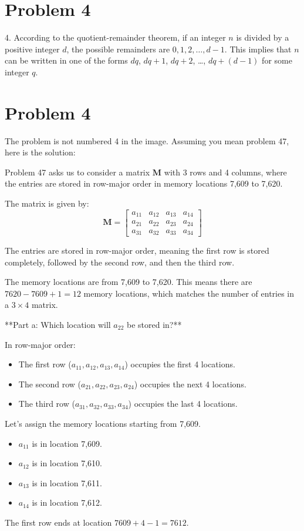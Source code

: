 \documentclass{article}
\begin{document}
\newpage

\section*{Problem 4}
4. According to the quotient-remainder theorem, if an integer $n$ is divided by a positive integer $d$, the possible remainders are $0, 1, 2, \dots, d-1$. This implies that $n$ can be written in one of the forms $dq$, $dq+1$, $dq+2$, \dots, $dq+(d-1)$ for some integer $q$.

\newpage

\section*{Problem 4}
The problem is not numbered 4 in the image. Assuming you mean problem 47, here is the solution:

Problem 47 asks us to consider a matrix $\mathbf{M}$ with 3 rows and 4 columns, where the entries are stored in row-major order in memory locations 7,609 to 7,620.

The matrix is given by:
$$
\mathbf{M} = \begin{bmatrix}
a_{11} & a_{12} & a_{13} & a_{14} \\
a_{21} & a_{22} & a_{23} & a_{24} \\
a_{31} & a_{32} & a_{33} & a_{34}
\end{bmatrix}
$$

The entries are stored in row-major order, meaning the first row is stored completely, followed by the second row, and then the third row.

The memory locations are from 7,609 to 7,620. This means there are $7620 - 7609 + 1 = 12$ memory locations, which matches the number of entries in a $3 \times 4$ matrix.

**Part a: Which location will $a_{22}$ be stored in?**

In row-major order:
\begin{itemize}
    \item The first row ($a_{11}, a_{12}, a_{13}, a_{14}$) occupies the first 4 locations.
    \item The second row ($a_{21}, a_{22}, a_{23}, a_{24}$) occupies the next 4 locations.
    \item The third row ($a_{31}, a_{32}, a_{33}, a_{34}$) occupies the last 4 locations.
\end{itemize}

Let's assign the memory locations starting from 7,609.
\begin{itemize}
    \item $a_{11}$ is in location 7,609.
    \item $a_{12}$ is in location 7,610.
    \item $a_{13}$ is in location 7,611.
    \item $a_{14}$ is in location 7,612.
\end{itemize}
The first row ends at location $7609 + 4 - 1 = 7612$.
\end{document}
